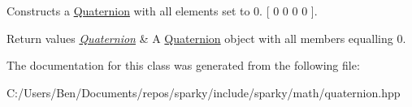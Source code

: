 Constructs a \hyperlink{classsparky_1_1_quaternion}{Quaternion} with all elements set to 0. \mbox{[} 0 0 0 0 \mbox{]}. 


\begin{DoxyRetVals}{Return values}
{\em \hyperlink{classsparky_1_1_quaternion}{Quaternion}} & A \hyperlink{classsparky_1_1_quaternion}{Quaternion} object with all members equalling 0. \\
\hline
\end{DoxyRetVals}


The documentation for this class was generated from the following file\+:\begin{DoxyCompactItemize}
\item 
C\+:/\+Users/\+Ben/\+Documents/repos/sparky/include/sparky/math/quaternion.\+hpp\end{DoxyCompactItemize}
